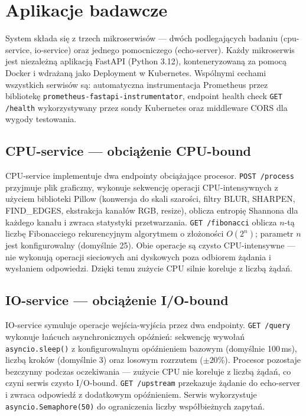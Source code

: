 \section{Aplikacje badawcze}

System składa się z trzech mikroserwisów --- dwóch podlegających badaniu (cpu-service, io-service) oraz jednego pomocniczego (echo-server). Każdy mikroserwis jest niezależną aplikacją FastAPI (Python 3.12), konteneryzowaną za pomocą Docker i wdrażaną jako Deployment w Kubernetes. Wspólnymi cechami wszystkich serwisów są: automatyczna instrumentacja Prometheus przez bibliotekę \texttt{prometheus-fastapi-instrumentator}, endpoint health check \texttt{GET /health} wykorzystywany przez sondy Kubernetes oraz middleware CORS dla wygody testowania.

\subsection{CPU-service --- obciążenie CPU-bound}

CPU-service implementuje dwa endpointy obciążające procesor. \texttt{POST /process} przyjmuje plik graficzny, wykonuje sekwencję operacji CPU-intensywnych z użyciem biblioteki Pillow (konwersja do skali szarości, filtry BLUR, SHARPEN, FIND\_EDGES, ekstrakcja kanałów RGB, resize), oblicza entropię Shannona dla każdego kanału i zwraca statystyki przetwarzania. \texttt{GET /fibonacci} oblicza $n$-tą liczbę Fibonacciego rekurencyjnym algorytmem o złożoności $O(2^{n})$; parametr $n$ jest konfigurowalny (domyślnie 25). Obie operacje są czysto CPU-intensywne --- nie wykonują operacji sieciowych ani dyskowych poza odbiorem żądania i wysłaniem odpowiedzi. Dzięki temu zużycie CPU silnie koreluje z liczbą żądań.

\subsection{IO-service --- obciążenie I/O-bound}

IO-service symuluje operacje wejścia-wyjścia przez dwa endpointy. \texttt{GET /query} wykonuje łańcuch asynchronicznych opóźnień: sekwencję wywołań \texttt{asyncio.sleep()} z konfigurowalnym opóźnieniem bazowym (domyślnie 100\,ms), liczbą kroków (domyślnie 3) oraz losowym rozrzutem ($\pm20\%$). Procesor pozostaje bezczynny podczas oczekiwania --- zużycie CPU nie koreluje z liczbą żądań, co czyni serwis czysto I/O-bound. \texttt{GET /upstream} przekazuje żądanie do echo-server i zwraca odpowiedź z dodatkowym opóźnieniem. Serwis wykorzystuje \texttt{asyncio.Semaphore(50)} do ograniczenia liczby współbieżnych zapytań.

